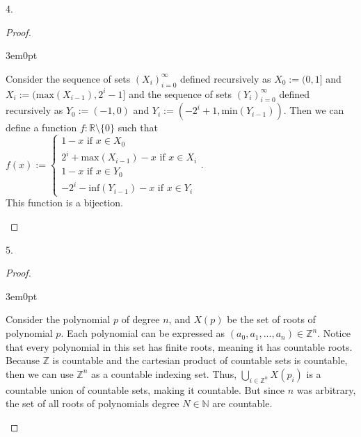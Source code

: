 \documentclass[11pt]{article}
\newcommand{\R}{\mathbb{R}}
\newcommand{\N}{\mathbb{N}}
\newcommand{\Z}{\mathbb{Z}}
\newenvironment{myproof}
{\begin{proof} \begin{adjustwidth}{3em}{0pt}$ $\par\nobreak\ignorespaces}
{\end{adjustwidth} \end{proof}}
\begin{document}
\begin{flushleft}
\newpage

4.

\begin{myproof}
Consider the sequence of sets $(X_i)_{i=0}^\infty$ defined recursively as $X_0 := (0,1]$ and $X_i := (\text{max}(X_{i-1}), 2^i -1]$ and the sequence of sets $(Y_i)_{i=0}^\infty$ defined recursively as $Y_0 := (-1,0)$ and $Y_i := (-2^i +1, \text{min}(Y_{i-1}))$. Then we can define a function $f: \R \setminus \{0 \}$ such that $f(x) := \begin{cases} 1-x \text{ if } x \in X_0 \\ 2^i + \text{max}(X_{i-1}) -x \text{ if } x \in X_i \\ 1-x \text{ if } x \in Y_0 \\ -2^i - \text{inf}(Y_{i-1}) -x \text{ if } x \in Y_i  \end{cases}$. \\
This function is a bijection.
\end{myproof}

\newpage

5.

\begin{myproof}
Consider the polynomial $p$ of degree $n$, and $X(p)$ be the set of roots of polynomial $p$. Each polynomial can be expressed as $(a_0, a_1, ..., a_n) \in \Z^n$. Notice that every polynomial in this set has finite roots, meaning it has countable roots. Because $\Z$ is countable and the cartesian product of countable sets is countable, then we can use $\Z^n$ as a countable indexing set. Thus, $\bigcup_{i \in \Z^n}X(p_i)$ is a countable union of countable sets, making it countable. But since $n$ was arbitrary, the set of all roots of polynomials degree $N \in \N$ are countable.
\end{myproof}


\end{flushleft}
\end{document}
